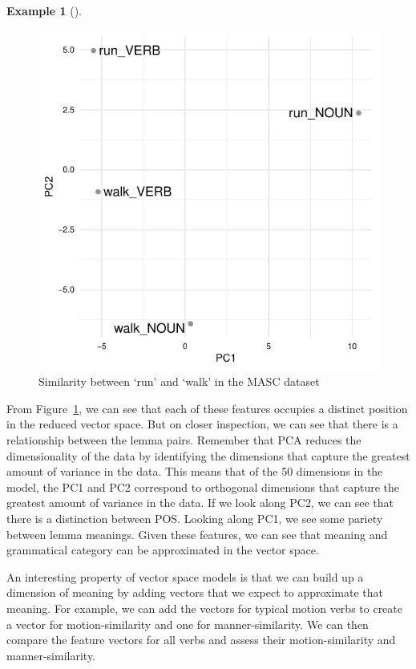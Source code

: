\documentclass[
  letterpaper,
]{latex/krantz}
\theoremstyle{definition}
\newtheorem{example}{Example}[chapter]
\theoremstyle{remark}
\begin{document}
\begin{example}[]
\begin{figure}[H]
{\includegraphics{part_4/8_explore_files/figure-pdf/fig-eda-masc-vsm-word2vec-similarity-1.pdf}

}

\caption{\label{fig-eda-masc-vsm-word2vec-similarity}Similarity between
`run' and `walk' in the MASC dataset}

\end{figure}%

\end{example}

From Figure~\ref{fig-eda-masc-vsm-word2vec-similarity}, we can see that
each of these features occupies a distinct position in the reduced
vector space. But on closer inspection, we can see that there is a
relationship between the lemma pairs. Remember that PCA reduces the
dimensionality of the data by identifying the dimensions that capture
the greatest amount of variance in the data. This means that of the 50
dimensions in the model, the PC1 and PC2 correspond to orthogonal
dimensions that capture the greatest amount of variance in the data. If
we look along PC2, we can see that there is a distinction between POS.
Looking along PC1, we see some pariety between lemma meanings. Given
these features, we can see that meaning and grammatical category can be
approximated in the vector space.

An interesting property of vector space models is that we can build up a
dimension of meaning by adding vectors that we expect to approximate
that meaning. For example, we can add the vectors for typical motion
verbs to create a vector for motion-similarity and one for
manner-similarity. We can then compare the feature vectors for all verbs
and assess their motion-similarity and manner-similarity.
\end{document}
